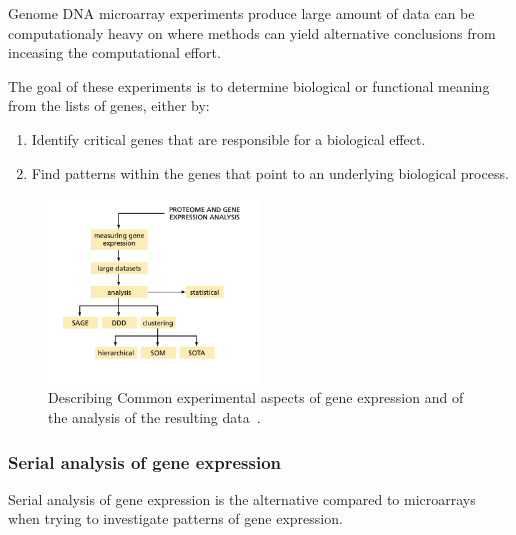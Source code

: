 \documentclass{report}
\begin{document}
Genome DNA microarray experiments produce large amount of data can be computationaly heavy on where methods can yield alternative conclusions from inceasing the computational effort.

The goal of these experiments is to determine biological or functional meaning from the lists of genes, either by:

\begin{enumerate}
    \item Identify critical genes that are responsible for a biological effect.
    \item Find patterns within the genes that point to an underlying biological process.
\end{enumerate}
\cite{zvelebil_understanding_2008}

\begin{figure}[H]
    \centering
    \includegraphics[width=0.5\textwidth]{Gene Expresion.png}
    \caption{\label{fig:Gene Expression}Describing Common experimental aspects of gene expression and of the analysis of the resulting data~\cite{zvelebil_understanding_2008}.}
\end{figure}

\subsubsection{Serial analysis of gene expression}

Serial analysis of gene expression is the alternative compared to microarrays when trying to investigate patterns of gene expression.
\end{document}
